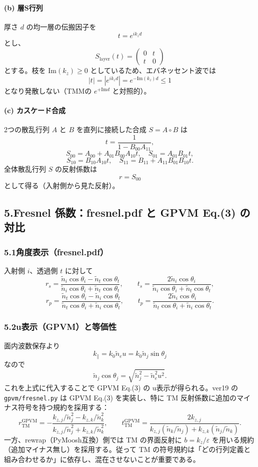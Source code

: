 \documentclass[a4paper,11pt]{jsarticle} %
\begin{document}
\paragraph{(b) 層S行列}
厚さ $d$ の均一層の伝搬因子を
\[
t=e^{ik_z d}
\]
とし、
\[
S_{\mathrm{layer}}(t)=
\begin{pmatrix}
0 & t\\
t & 0
\end{pmatrix}
\]
とする。枝を $\mathrm{Im}(k_z)\ge 0$ としているため、エバネッセント波では
\[
|t|=|e^{ik_z d}|=e^{-\mathrm{Im}(k_z)d}\le 1
\]
となり発散しない（TMMの $e^{+\mathrm{Im}d}$ と対照的）。

\paragraph{(c) カスケード合成}
2つの散乱行列 $A$ と $B$ を直列に接続した合成 $S=A\circ B$ は
\[
t=\frac{1}{1-B_{00}A_{11}},
\]
\[
S_{00}=A_{00}+A_{01}B_{00}A_{10}t,\quad
S_{01}=A_{01}B_{01}t,
\]
\[
S_{10}=B_{10}A_{10}t,\quad
S_{11}=B_{11}+A_{11}B_{01}B_{10}t.
\]
全体散乱行列 $S$ の反射係数は
\[
r=S_{00}
\]
として得る（入射側から見た反射）。

\subsection*{5.\;Fresnel 係数：fresnel.pdf と GPVM Eq.(3) の対比}
\subsubsection*{5.1\;角度表示（fresnel.pdf）}
入射側 $i$、透過側 $t$ に対して
\[
r_s=\frac{\tilde n_i\cos\theta_i-\tilde n_t\cos\theta_t}{\tilde n_i\cos\theta_i+\tilde n_t\cos\theta_t},
\qquad
t_s=\frac{2\tilde n_i\cos\theta_i}{\tilde n_i\cos\theta_i+\tilde n_t\cos\theta_t},
\]
\[
r_p=\frac{\tilde n_t\cos\theta_i-\tilde n_i\cos\theta_t}{\tilde n_t\cos\theta_i+\tilde n_i\cos\theta_t},
\qquad
t_p=\frac{2\tilde n_i\cos\theta_i}{\tilde n_t\cos\theta_i+\tilde n_i\cos\theta_t}.
\]

\subsubsection*{5.2\;u表示（GPVM）と等価性}
面内波数保存より
\[
k_\parallel = k_0\tilde n_e u = k_0\tilde n_j \sin\theta_j
\]
なので
\[
\tilde n_j\cos\theta_j = \sqrt{\tilde n_j^2-\tilde n_e^2u^2}.
\]
これを上式に代入することで GPVM Eq.(3) の u表示が得られる。ver19 の \texttt{gpvm/fresnel.py} は GPVM Eq.(3) を実装し、特に TM 反射係数に追加のマイナス符号を持つ規約を採用する：
\[
r_{\mathrm{TM}}^{\mathrm{GPVM}}
=-\frac{k_{z,j}/\tilde n_j^2-k_{z,k}/\tilde n_k^2}{k_{z,j}/\tilde n_j^2+k_{z,k}/\tilde n_k^2},
\qquad
t_{\mathrm{TM}}^{\mathrm{GPVM}}
=\frac{2k_{z,j}}{k_{z,j}(\tilde n_k/\tilde n_j)+k_{z,k}(\tilde n_j/\tilde n_k)}.
\]
一方、rewrap（PyMoosh互換）側では TM の界面反射に $b=k_z/\varepsilon$ を用いる規約（追加マイナス無し）を採用する。従って TM の符号規約は「どの行列定義と組み合わせるか」に依存し、混在させないことが重要である。
\end{document}

